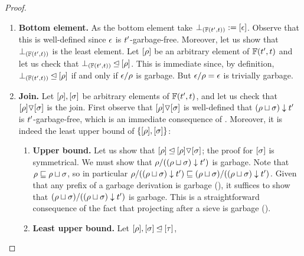 \begin{proof}
\begin{enumerate}
\begin{enumerate}
    for all $\redseq \in F$:
    \[
      |\redseq/\tm'| = \sum_{i=1}^{n} |\underbrace{\redex/(\tm'/\redex_1\hdots\redex_{i-1})}_{\neq \emptyset}| \geq n = |\redseq|
    \]
    As a consequence given any $\tobeta$-derivation $\redseq \in F$ we have that $|\redseq| \leq |\redseq/\tm'| \leq M$.
    This concludes the proof that $\ulbFree{\tm'}{\tm}$ is finite.
  \item {\bf Bottom element.}
    As the bottom element take $\bot_{(\mathbb{F}(t', t))} := {[\epsilon]}$.
    Observe that this is well-defined since $\epsilon$ is $t'$-garbage-free.
    Moreover, let us show that $\bot_{(\mathbb{F}(t', t))}$ is the least element.
    Let $[\rho]$ be an arbitrary element of $\ulbFree{\tm'}{\tm}$
    and let us check that $\bot_{(\mathbb{F}(t', t))} \unlhd [\rho]$.
    This is immediate since,
    by definition, $\bot_{(\mathbb{F}(t', t))} \unlhd [\rho]$
    if and only if $\epsilon/\rho$ is garbage.
    But $\epsilon/\rho = \epsilon$ is trivially garbage.
  \item {\bf Join.}
    Let $[\rho],[\sigma]$ be arbitrary elements of $\ulbFree{\tm'}{\tm}$,
    and let us check that $[\rho] \triangledown [\sigma]$ is the join.
    First observe that $[\rho] \triangledown [\sigma]$ is well-defined
    \ie that $(\rho \sqcup \sigma) \downarrow t'$ is $t'$-garbage-free,
    which is an immediate consequence of .
    Moreover, it is indeed the least upper bound of $\{[\rho],[\sigma]\}$:
    \begin{enumerate}
    \item {\bf Upper bound.}
      Let us show that $[\rho] \unlhd [\rho] \triangledown [\sigma]$; the proof for $[\sigma]$ is symmetrical.
      We must show that $\rho/((\rho \sqcup \sigma) \downarrow t')$ is garbage.
      Note that $\rho \sqsubseteq \rho \sqcup \sigma$,
      so in particular $\rho/((\rho \sqcup \sigma) \downarrow t') \sqsubseteq (\rho \sqcup \sigma)/((\rho \sqcup \sigma) \downarrow t')$.
      Given that any prefix of a garbage derivation is garbage (),
      it suffices to show that $(\rho \sqcup \sigma)/((\rho \sqcup \sigma) \downarrow t')$ is garbage.
      This is a straightforward consequence of the fact that projecting after a sieve is garbage ().
    \item {\bf Least upper bound.}
      Let $[\rho], [\sigma] \unlhd [\tau]$,

\end{enumerate}
\end{enumerate}
\end{enumerate}
\end{proof}
